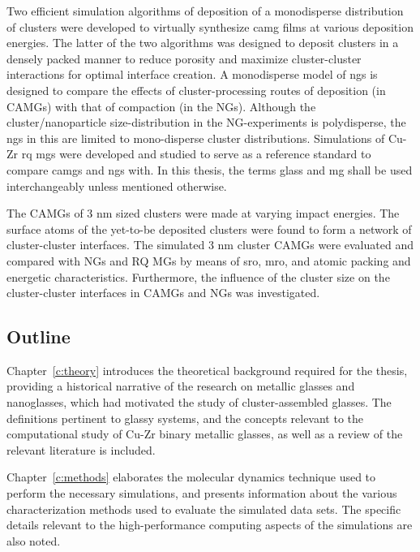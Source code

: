 Two efficient simulation algorithms of deposition of a monodisperse distribution of clusters were developed to virtually synthesize \gls{camg} films at various deposition energies. The latter of the two algorithms was designed to deposit clusters in a densely packed manner to reduce porosity and maximize cluster-cluster interactions for optimal interface creation. A monodisperse model of \gls{ng}s is designed to compare the effects of cluster-processing routes of deposition (in CAMGs) with that of compaction (in the NGs). Although the cluster/nanoparticle size-distribution in the NG-experiments is polydisperse, the \gls{ng}s in this are limited to mono-disperse cluster distributions. Simulations of Cu-Zr \gls{rq} \gls{mg}s were developed and studied to serve as a reference standard to compare \gls{camg}s and \gls{ng}s with. In this thesis, the terms glass and \gls{mg} shall be used interchangeably unless mentioned otherwise. \par

The CAMGs of 3 nm sized \cz clusters were made at varying impact energies. The surface atoms of the yet-to-be deposited clusters were found to form a network of cluster-cluster interfaces. The simulated 3 nm cluster CAMGs were evaluated and compared with NGs and RQ MGs by means of \gls{sro}, \gls{mro}, and atomic packing and energetic characteristics. %
Furthermore, the influence of the cluster size on the cluster-cluster interfaces in CAMGs and NGs was investigated. %

\subsection{Outline}
Chapter~\ref{c:theory} introduces the theoretical background required for the thesis, providing a historical narrative of the research on metallic glasses and nanoglasses, which had motivated the study of cluster-assembled glasses. The definitions pertinent to glassy systems, and the concepts relevant to the computational study of Cu-Zr binary metallic glasses, as well as a review of the relevant literature is included. \par

Chapter~\ref{c:methods} elaborates the molecular dynamics technique used to perform the necessary simulations, and presents information about the various characterization methods used to evaluate the simulated data sets. The specific details relevant to the high-performance computing aspects of the simulations are also noted. \par

